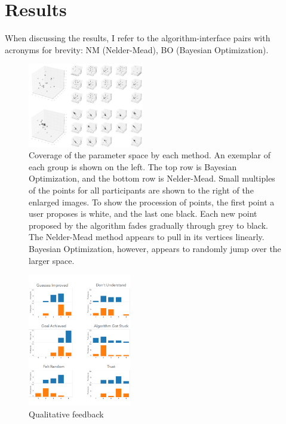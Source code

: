 \section{Results}

When discussing the results, I refer to the algorithm-interface pairs with acronyms for brevity:
NM (Nelder-Mead),
BO (Bayesian Optimization).

\begin{figure}
  \centering
  \includegraphics[width=0.45\textwidth]{figures/scatters}
  \caption{%
    Coverage of the parameter space by each method.  
    An exemplar of each group is shown on the left. 
    The top row is Bayesian Optimization, and the bottom row is Nelder-Mead.
    Small multiples of the points for all participants are shown to the right of the enlarged images.
    To show the procession of points, the first point a user proposes is white, and the last one black.
    Each new point proposed by the algorithm fades gradually through grey to black.
    The Nelder-Mead method appears to pull in its vertices linearly.
    Bayesian Optimization, however, appears to randomly jump over the larger space.
  }\label{fig:coverage}
\end{figure}

\begin{figure}
  \centering
  \includegraphics[width=0.4\textwidth]{figures/feedback}
  \caption{%
    Qualitative feedback
  }\label{fig:feedback}
\end{figure}

